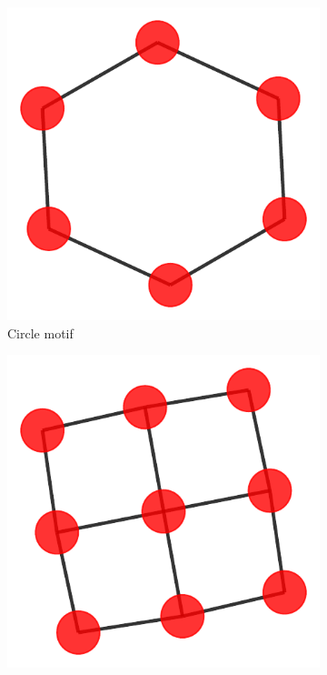 \begin{figure}[h]
\begin{subfigure}[b]{0.2\textwidth}
        \includegraphics[width=\linewidth]{img/Motif_Vis/Tree-Cycles-MOTIF.pdf}
        \caption{Circle motif}
        \label{fig:subfig2}
    \end{subfigure}
    \begin{subfigure}[b]{0.2\textwidth}
        \includegraphics[width=\linewidth]{img/Motif_Vis/Tree-Grid-MOTIF.pdf}

\end{subfigure}
\end{figure}
